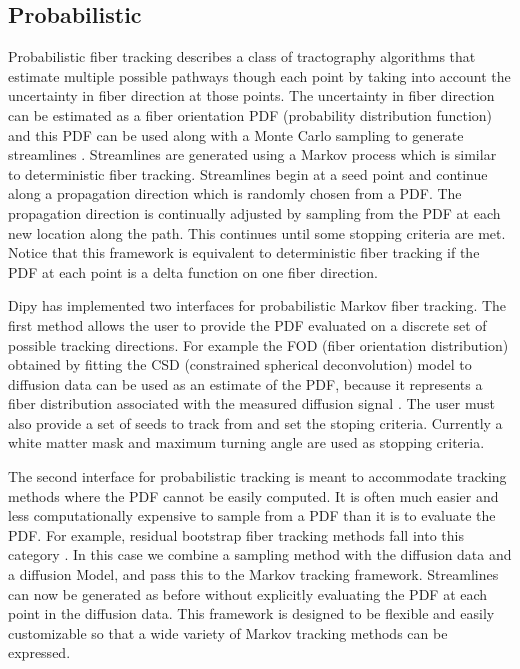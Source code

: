 \documentclass{bioinfo}
\begin{document}
\subsection{Probabilistic}

Probabilistic fiber tracking describes a class of tractography algorithms that
estimate multiple possible pathways though each point by taking into
account the uncertainty in fiber direction at those points. The uncertainty in
fiber direction can be estimated as a fiber orientation PDF (probability distribution
function) and this PDF can be used along with a Monte Carlo sampling to
generate streamlines \citep{morris2008probabilistic}. Streamlines are generated using a
Markov process which is similar to deterministic fiber tracking. Streamlines begin
at a seed point and continue along a propagation direction which is randomly
chosen from a PDF. The propagation direction is continually adjusted by
sampling from the PDF at each new location along the path. This continues until
some stopping criteria are met. Notice that this framework is equivalent to
deterministic fiber tracking if the PDF at each point is a delta function on
one fiber direction.

Dipy has implemented two interfaces for probabilistic Markov fiber tracking. The
first method allows the user to provide the PDF evaluated on a discrete set of
possible tracking directions. For example the FOD (fiber orientation distribution)
obtained by fitting the CSD (constrained spherical deconvolution) model to diffusion
data can be used as an estimate of the PDF, because it represents a fiber distribution
associated with the measured diffusion signal \citep{jeurissen2011probabilistic}. The user must
also provide a set of seeds to track from and set the stoping criteria. Currently a white matter mask and maximum turning angle are used as stopping criteria.

The second interface for probabilistic tracking is meant to accommodate	tracking
methods where the PDF cannot be easily computed. It is often much easier and less
computationally expensive to sample from a PDF than it is to evaluate the PDF. For
example, residual bootstrap fiber tracking methods fall into this category \citep{berman2008probabilistic}.
In this case we combine a sampling method with the diffusion data and a diffusion Model,
and pass this to the Markov tracking framework. Streamlines can now be generated
as before without explicitly evaluating the PDF at each
point in the diffusion data. This framework is designed to be flexible and easily
customizable so that a wide variety of Markov tracking methods can be expressed.
\end{document}
